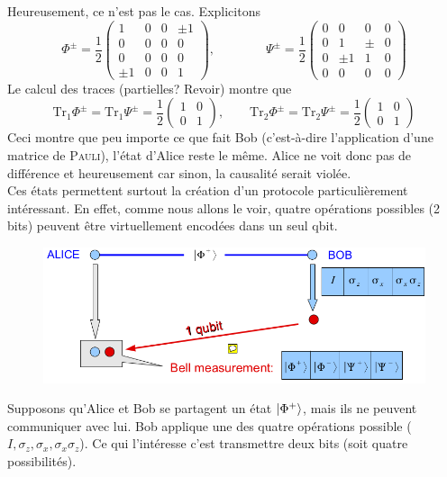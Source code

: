 Heureusement, ce n'est pas le cas. Explicitons
\begin{equation}
\Phi^{\pm} = \frac{1}{2}\left(\begin{array}{cccc}
1&0&0&\pm1\\
0&0&0&0\\
0&0&0&0\\
\pm1&0&0&1
\end{array}\right),\qquad\qquad
\Psi^{\pm} = \frac{1}{2}\left(\begin{array}{cccc}
0&0&0&0\\
0&1&\pm&0\\
0&\pm1&1&0\\
0&0&0&0
\end{array}\right)
\end{equation}
Le calcul des traces (partielles? Revoir) montre que
\begin{equation}
\text{Tr}_1\Phi^\pm = \text{Tr}_1 \Psi^\pm = \frac{1}{2}\left(\begin{array}{cc}
1&0\\
0&1
\end{array}\right),\qquad
\text{Tr}_2\Phi^\pm = \text{Tr}_2 \Psi^\pm = \frac{1}{2}\left(\begin{array}{cc}
1&0\\
0&1
\end{array}\right)
\end{equation}
Ceci montre que peu importe ce que fait Bob (c'est-à-dire l'application d'une matrice
de \textsc{Pauli}), l'état d'Alice reste le même. Alice ne voit donc pas de différence
et heureusement car sinon, la causalité serait violée.\\

Ces états permettent surtout la création d'un protocole particulièrement intéressant. 
En effet, comme nous allons le voir, quatre opérations possibles (2 bits) peuvent être
virtuellement encodées dans un seul qbit.\\

	\begin{figure}
	\vspace{-5mm}
	\includegraphics[scale=0.25]{ch2/image6}
	\end{figure}
Supposons qu'Alice et Bob se partagent un état $\ket{\Phi^+}$, mais ils ne peuvent
communiquer avec lui. Bob applique une des quatre opérations possible ($I, \sigma_z, 
\sigma_x,\sigma_x\sigma_z$). Ce qui l'intéresse c'est transmettre deux bits (soit 
quatre possibilités).\\

